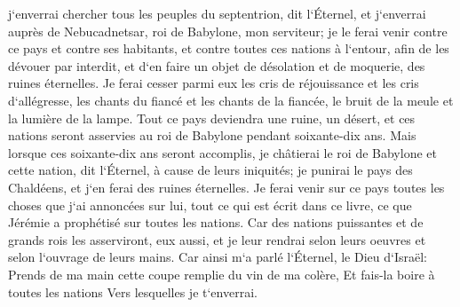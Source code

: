 \verse j`enverrai chercher tous les peuples du septentrion, dit l`Éternel, et j`enverrai auprès de Nebucadnetsar, roi de Babylone, mon serviteur; je le ferai venir contre ce pays et contre ses habitants, et contre toutes ces nations à l`entour, afin de les dévouer par interdit, et d`en faire un objet de désolation et de moquerie, des ruines éternelles. 
\verse Je ferai cesser parmi eux les cris de réjouissance et les cris d`allégresse, les chants du fiancé et les chants de la fiancée, le bruit de la meule et la lumière de la lampe. 
\verse Tout ce pays deviendra une ruine, un désert, et ces nations seront asservies au roi de Babylone pendant soixante-dix ans. 
\verse Mais lorsque ces soixante-dix ans seront accomplis, je châtierai le roi de Babylone et cette nation, dit l`Éternel, à cause de leurs iniquités; je punirai le pays des Chaldéens, et j`en ferai des ruines éternelles. 
\verse Je ferai venir sur ce pays toutes les choses que j`ai annoncées sur lui, tout ce qui est écrit dans ce livre, ce que Jérémie a prophétisé sur toutes les nations. 
\verse Car des nations puissantes et de grands rois les asserviront, eux aussi, et je leur rendrai selon leurs oeuvres et selon l`ouvrage de leurs mains. 
\verse Car ainsi m`a parlé l`Éternel, le Dieu d`Israël: Prends de ma main cette coupe remplie du vin de ma colère, Et fais-la boire à toutes les nations Vers lesquelles je t`enverrai. 
